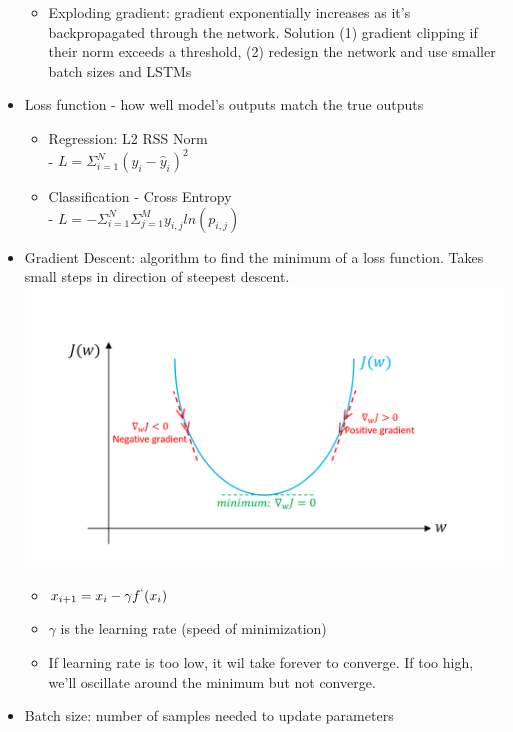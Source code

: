 \documentclass{article}
\begin{document}
\begin{multicols*}{3}
\begin{itemize}[noitemsep]
\begin{itemize}
            \item Exploding gradient: gradient exponentially increases as it's
            backpropagated through the network. Solution (1) gradient clipping 
            if their norm exceeds a threshold, (2) redesign the network 
            and use smaller batch sizes and LSTMs
        \end{itemize}
        \item Loss function - how well model's outputs
        match the true outputs
        \begin{itemize}
            \item Regression: L2 RSS Norm \\
            - $L = \Sigma_{i=1}^N(y_i-\hat{y}_i)^2$
            \item Classification - Cross Entropy \\
            - $L = -\Sigma_{i=1}^N\Sigma_{j=1}^My_{i,j}ln(p_{i,j})$
        \end{itemize}
        \item Gradient Descent: algorithm to find the minimum of  
        a loss function. Takes small steps in direction of steepest descent.
        \includegraphics[width=\linewidth]{gradient_descent}
        \begin{itemize}
            \item $x_{i+1} = x_i - \gamma f^`(x_i)$
            \item $\gamma$ is the learning rate (speed of minimization)
            \item If learning rate is too low, it wil take forever to 
            converge. If too high, we'll oscillate around the minimum 
            but not converge.
        \end{itemize}
        \item Batch size: number of samples needed to update parameters

\end{itemize}
\end{multicols*}
\end{document}
